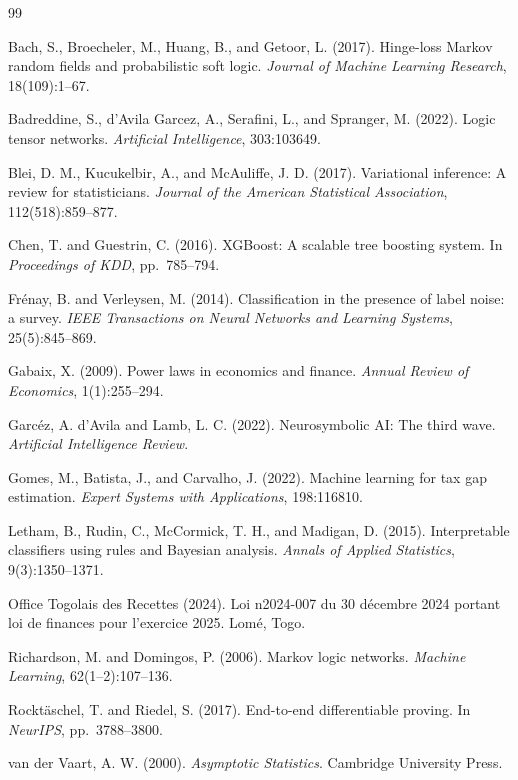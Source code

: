 \documentclass[letterpaper]{article}
\begin{document}

\begin{thebibliography}{99}

Bach, S., Broecheler, M., Huang, B., and Getoor, L. (2017).
Hinge-loss Markov random fields and probabilistic soft logic.
\textit{Journal of Machine Learning Research}, 18(109):1--67.

Badreddine, S., d'Avila Garcez, A., Serafini, L., and Spranger, M. (2022).
Logic tensor networks.
\textit{Artificial Intelligence}, 303:103649.

Blei, D. M., Kucukelbir, A., and McAuliffe, J. D. (2017).
Variational inference: A review for statisticians.
\textit{Journal of the American Statistical Association}, 112(518):859--877.

Chen, T. and Guestrin, C. (2016).
{XGBoost}: A scalable tree boosting system.
In \textit{Proceedings of KDD}, pp.\ 785--794.

Fr{\'e}nay, B. and Verleysen, M. (2014).
Classification in the presence of label noise: a survey.
\textit{IEEE Transactions on Neural Networks and Learning Systems},
25(5):845--869.

Gabaix, X. (2009).
Power laws in economics and finance.
\textit{Annual Review of Economics}, 1(1):255--294.

Garc{\'e}z, A. d'Avila and Lamb, L. C. (2022).
Neurosymbolic AI: The third wave.
\textit{Artificial Intelligence Review}.

Gomes, M., Batista, J., and Carvalho, J. (2022).
Machine learning for tax gap estimation.
\textit{Expert Systems with Applications}, 198:116810.

Letham, B., Rudin, C., McCormick, T. H., and Madigan, D. (2015).
Interpretable classifiers using rules and Bayesian analysis.
\textit{Annals of Applied Statistics}, 9(3):1350--1371.

Office Togolais des Recettes (2024).
Loi n\textdegree{}2024-007 du 30 d\'ecembre 2024 portant loi de finances
pour l'exercice 2025. Lom\'e, Togo.

Richardson, M. and Domingos, P. (2006).
Markov logic networks.
\textit{Machine Learning}, 62(1--2):107--136.

Rockt{\"a}schel, T. and Riedel, S. (2017).
End-to-end differentiable proving.
In \textit{NeurIPS}, pp.\ 3788--3800.

van der Vaart, A. W. (2000).
\textit{Asymptotic Statistics}.
Cambridge University Press.

\end{thebibliography}

\appendix

\end{document}
